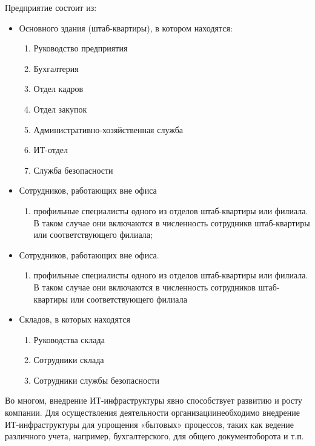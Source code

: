 \documentclass[14pt, a4paper]{extarticle}
\begin{document}
Предприятие состоит из:
\begin{itemize}
    \item Основного здания (штаб-квартиры), в котором находятся:
        \begin{enumerate}
            \item Руководство предприятия
            \item Бухгалтерия
            \item Отдел кадров
            \item Отдел закупок
            \item Административно-хозяйственная служба
            \item ИТ-отдел
            \item Служба безопасности
        \end{enumerate}
    \item Сотрудников, работающих вне офиса
        \begin{enumerate}
            \item профильные специалисты одного из отделов штаб-квартиры или 
                  филиала. В таком случае они включаются в численность 
                  сотрудникв
                  штаб-квартиры или соответствующего филиала; 
        \end{enumerate}
    \item Сотрудников, работающих вне офиса.
        \begin{enumerate}
            \item профильные специалисты одного из отделов штаб-квартиры или 
                филиала. В таком случае они включаются в численность 
                сотрудников штаб-квартиры или соответствующего филиала
        \end{enumerate}

    \item Складов, в которых находятся
        \begin{enumerate}
            \item Руководства склада
            \item Сотрудники склада
            \item Сотрудники службы безопасности
        \end{enumerate}

\end{itemize} 

Во многом, внедрение ИТ-инфраструктуры явно способствует развитию и
росту компании. Для осуществления деятельности организациинеобходимо
внедрение ИТ-инфраструктуры для упрощения «бытовых» процессов, таких как
ведение различного учета, например, бухгалтерского, для общего документоборота и
т.п.
\end{document}
